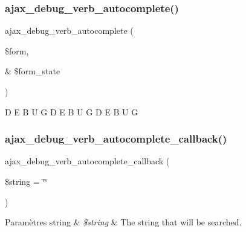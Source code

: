 \subsubsection{\texorpdfstring{ajax\+\_\+debug\+\_\+verb\+\_\+autocomplete()}{ajax\_debug\_verb\_autocomplete()}}
{\footnotesize\ttfamily ajax\+\_\+debug\+\_\+verb\+\_\+autocomplete (\begin{DoxyParamCaption}\item[{}]{\$form,  }\item[{\&}]{\$form\+\_\+state }\end{DoxyParamCaption})}

D E B U G D E B U G D E B U G \hypertarget{php_2conjoc__debug__webForm_8inc_aedd67c4b770b58826708010ce4ef7ac7}{}\label{php_2conjoc__debug__webForm_8inc_aedd67c4b770b58826708010ce4ef7ac7} 
\subsubsection{\texorpdfstring{ajax\+\_\+debug\+\_\+verb\+\_\+autocomplete\+\_\+callback()}{ajax\_debug\_verb\_autocomplete\_callback()}}
{\footnotesize\ttfamily ajax\+\_\+debug\+\_\+verb\+\_\+autocomplete\+\_\+callback (\begin{DoxyParamCaption}\item[{}]{\$string = {\ttfamily \char`\"{}\char`\"{}} }\end{DoxyParamCaption})}


\begin{DoxyParams}[1]{Paramètres}
string & {\em \$string} & The string that will be searched. \\
\hline
\end{DoxyParams}
